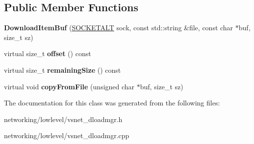 \subsection*{Public Member Functions}
\begin{DoxyCompactItemize}
\item 
{\bfseries Download\+Item\+Buf} (\hyperlink{classSOCKETALT}{S\+O\+C\+K\+E\+T\+A\+LT} sock, const std\+::string \&file, const char $\ast$buf, size\+\_\+t sz)\hypertarget{classVsnetDownload_1_1Server_1_1DownloadItemBuf_ad4d06bc2865cde8972ab2fe4e12e8f18}{}\label{classVsnetDownload_1_1Server_1_1DownloadItemBuf_ad4d06bc2865cde8972ab2fe4e12e8f18}

\item 
virtual size\+\_\+t {\bfseries offset} () const \hypertarget{classVsnetDownload_1_1Server_1_1DownloadItemBuf_a5915b9f8a54b0633bd965e17df3f5f22}{}\label{classVsnetDownload_1_1Server_1_1DownloadItemBuf_a5915b9f8a54b0633bd965e17df3f5f22}

\item 
virtual size\+\_\+t {\bfseries remaining\+Size} () const \hypertarget{classVsnetDownload_1_1Server_1_1DownloadItemBuf_ac1baa579a4e1355afaa77f879091791d}{}\label{classVsnetDownload_1_1Server_1_1DownloadItemBuf_ac1baa579a4e1355afaa77f879091791d}

\item 
virtual void {\bfseries copy\+From\+File} (unsigned char $\ast$buf, size\+\_\+t sz)\hypertarget{classVsnetDownload_1_1Server_1_1DownloadItemBuf_a9fa757c34e4e4a6629b66a9094493093}{}\label{classVsnetDownload_1_1Server_1_1DownloadItemBuf_a9fa757c34e4e4a6629b66a9094493093}

\end{DoxyCompactItemize}


The documentation for this class was generated from the following files\+:\begin{DoxyCompactItemize}
\item 
networking/lowlevel/vsnet\+\_\+dloadmgr.\+h\item 
networking/lowlevel/vsnet\+\_\+dloadmgr.\+cpp\end{DoxyCompactItemize}
